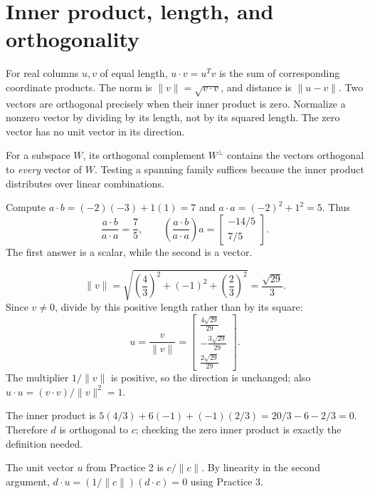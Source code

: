 \section{Inner product, length, and orthogonality}
For real columns $u,v$ of equal length, $u\cdot v=u^Tv$ is the sum of
corresponding coordinate products. The norm is
$\|v\|=\sqrt{v\cdot v}$, and distance is $\|u-v\|$.
Two vectors are orthogonal precisely when their inner product is zero.
Normalize a nonzero vector by dividing by its length, not by its squared
length. The zero vector has no unit vector in its direction.

For a subspace $W$, its orthogonal complement $W^\perp$ contains the
vectors orthogonal to \emph{every} vector of $W$. Testing a spanning family
suffices because the inner product distributes over linear combinations.

Compute $a\cdot b=(-2)(-3)+1(1)=7$ and
$a\cdot a=(-2)^2+1^2=5$. Thus
\[
\frac{a\cdot b}{a\cdot a}=\frac75,\qquad
\left(\frac{a\cdot b}{a\cdot a}\right)a
=\begin{bmatrix}-14/5\\7/5\end{bmatrix}.
\]
The first answer is a scalar, while the second is a vector.

\[\|v\|=\sqrt{(\frac{4}{3})^2+(-1)^2+(\frac{2}{3})^2}=\frac{\sqrt{29}}{3}.\]
Since $v\ne0$, divide by this positive length rather than by its square:
\[u=\frac{v}{\|v\|}=\left[\begin{array}{r}\frac{4 \sqrt{29}}{29}\\- \frac{3 \sqrt{29}}{29}\\\frac{2 \sqrt{29}}{29}\end{array}\right].\]
The multiplier $1/\|v\|$ is positive, so the direction is unchanged; also $u\cdot u=(v\cdot v)/\|v\|^2=1$.

The inner product is
$5(4/3)+6(-1)+(-1)(2/3)=20/3-6-2/3=0$.
Therefore $d$ is orthogonal to $c$; checking the zero inner product is
exactly the definition needed.

The unit vector $u$ from Practice 2 is $c/\|c\|$.
By linearity in the second argument,
$d\cdot u=(1/\|c\|)(d\cdot c)=0$ using Practice 3.

